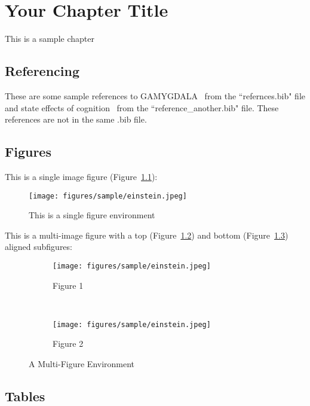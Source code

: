 \chapter{Your Chapter Title}

This is a sample chapter

\section{Referencing}
These are some sample references to GAMYGDALA~ \cite{popescu2014gamygdala} from the ``refernces.bib" file and state effects of cognition~\cite{hudlicka2002time} from the ``reference\_another.bib" file. These references are not in the same .bib file.

\section{Figures}
This is a single image figure (Figure~\ref{fig_singleenv}):

\begin{figure}[ht]
  \centering
  \texttt{[image: figures/sample/einstein.jpeg]}
  \caption[Single Figure Environment Listed Title]{This is a single figure environment}
  \label{fig_singleenv}
\end{figure}

This is a multi-image figure with a top (Figure~\ref{fig_multienv_1}) and bottom (Figure~\ref{fig_multienv_2}) aligned subfigures:

\begin{figure}[ht]
  \centering
  \begin{subfigure}[t]{.6\textwidth}
    \centering
    \texttt{[image: figures/sample/einstein.jpeg]}
    \caption{Figure 1}
    \label{fig_multienv_1}
  \end{subfigure}
  ~
  \begin{subfigure}[t]{0.7\textwidth}
    \centering
    \texttt{[image: figures/sample/einstein.jpeg]}
    \caption{Figure 2}
    \label{fig_multienv_2}
  \end{subfigure}

  \caption{A Multi-Figure Environment}
  \label{fig_multienv}
\end{figure}

\section{Tables}

